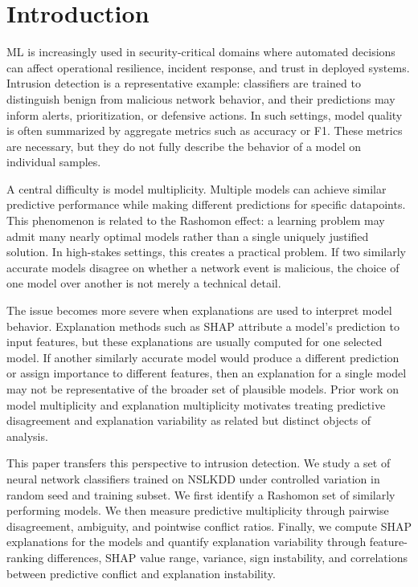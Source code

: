 \section{Introduction}

\gls{ML} is increasingly used in security-critical domains where automated decisions can affect operational resilience, incident response, and trust in deployed systems. Intrusion detection is a representative example: classifiers are trained to distinguish benign from malicious network behavior, and their predictions may inform alerts, prioritization, or defensive actions. In such settings, model quality is often summarized by aggregate metrics such as accuracy or \gls{F1}. These metrics are necessary, but they do not fully describe the behavior of a model on individual samples.

A central difficulty is model multiplicity. Multiple models can achieve similar predictive performance while making different predictions for specific datapoints. This phenomenon is related to the Rashomon effect: a learning problem may admit many nearly optimal models rather than a single uniquely justified solution. In high-stakes settings, this creates a practical problem. If two similarly accurate models disagree on whether a network event is malicious, the choice of one model over another is not merely a technical detail.

The issue becomes more severe when explanations are used to interpret model behavior. Explanation methods such as \gls{SHAP} attribute a model's prediction to input features, but these explanations are usually computed for one selected model. If another similarly accurate model would produce a different prediction or assign importance to different features, then an explanation for a single model may not be representative of the broader set of plausible models. Prior work on model multiplicity and explanation multiplicity motivates treating predictive disagreement and explanation variability as related but distinct objects of analysis.

This paper transfers this perspective to intrusion detection. We study a set of neural network classifiers trained on \gls{NSLKDD} under controlled variation in random seed and training subset. We first identify a Rashomon set of similarly performing models. We then measure predictive multiplicity through pairwise disagreement, ambiguity, and pointwise conflict ratios. Finally, we compute \gls{SHAP} explanations for the models and quantify explanation variability through feature-ranking differences, \gls{SHAP} value range, variance, sign instability, and correlations between predictive conflict and explanation instability.

